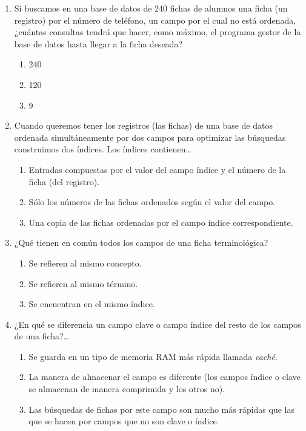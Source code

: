 \begin{enumerate}
\item Si buscamos en una base de datos de 240 fichas de alumnos una ficha (un registro) por el número de teléfono, un campo por el cual no está ordenada, ¿cuántas consultas tendrá que hacer, como máximo, el programa gestor de la base de datos hasta llegar a la ficha deseada? \begin{enumerate} \item 240 \item 120 \item 9 \end{enumerate} 

\item Cuando queremos tener los registros (las fichas) de una base de datos ordenada simultáneamente por dos campos para optimizar las búsquedas construimos dos índices. Los índices contienen{\ldots} \begin{enumerate} \item Entradas compuestas por el valor del campo índice y el número de la ficha (del registro). \item Sólo los números de las fichas ordenados según el valor del campo. \item Una copia de las fichas ordenadas por el campo índice correspondiente. \end{enumerate} 

\item ¿Qué tienen en común todos los campos de una ficha terminológica? \begin{enumerate} \item Se refieren al mismo concepto. \item Se refieren al mismo término. \item Se encuentran en el mismo índice. \end{enumerate} 

\item ¿En qué se diferencia un campo clave o campo índice del resto de los campos de una ficha?{\ldots} \begin{enumerate} \item Se guarda en un tipo de memoria RAM más rápida llamada \emph{caché}. \item La manera de almacenar el campo es diferente (los campos índice o clave se almacenan de manera comprimida y los otros no). \item Las búsquedas de fichas por este campo son mucho más rápidas que las que se hacen por campos que no son clave o índice. \end{enumerate} 


\end{enumerate}
